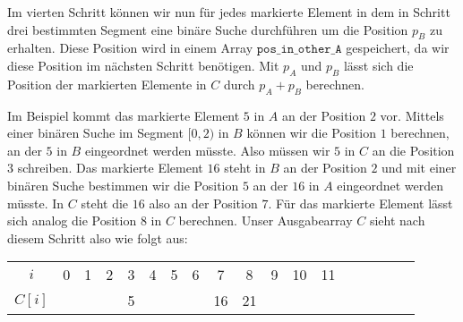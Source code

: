 Im vierten Schritt können wir nun für jedes markierte Element in dem in Schritt drei bestimmten Segment eine binäre Suche durchführen um die Position $p_B$ zu erhalten. Diese Position wird in einem Array $\texttt{pos\_in\_other\_A}$ gespeichert, da wir diese Position im nächsten Schritt benötigen. Mit $p_A$ und $p_B$ lässt sich die Position der markierten Elemente in $C$ durch $p_A+p_B$ berechnen. \par
Im Beispiel kommt das markierte Element $5$ in $A$ an der Position $2$ vor. Mittels einer binären Suche im Segment $[0,2)$ in $B$ können wir die Position $1$ berechnen, an der $5$ in $B$ eingeordnet werden müsste. Also müssen wir $5$ in $C$ an die Position $3$ schreiben. Das markierte Element $16$ steht in $B$ an der Position $2$ und mit einer binären Suche bestimmen wir die Position $5$ an der $16$ in $A$ eingeordnet werden müsste. In $C$ steht die $16$ also an der Position $7$. Für das markierte Element lässt sich analog die Position $8$ in $C$ berechnen. Unser Ausgabearray $C$ sieht nach diesem Schritt also wie folgt aus:

\begin{table}[H]
	\small
	\centering
	\begin{tabular}{c| c c c c c c c c c c c c c c c c c}
		$i$ & 0 & 1 & 2 & 3 & 4 & 5 & 6 & 7 & 8 & 9 & 10 & 11 \\
		$C[i]$ & & & & 5 & & & & 16 & 21 & & & & \\
	\end{tabular}
\end{table}


